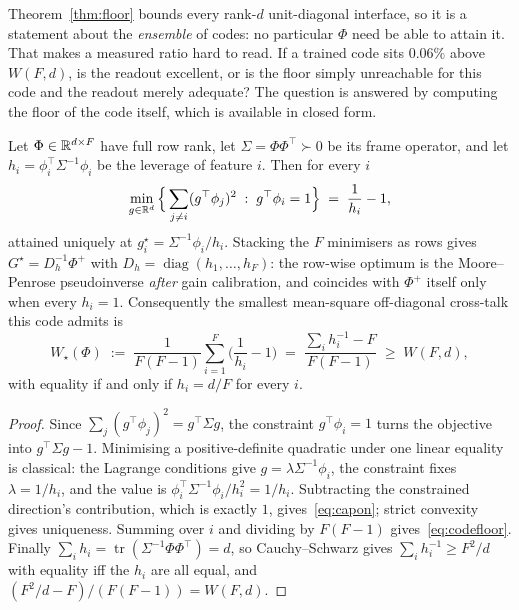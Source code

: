 Theorem~\ref{thm:floor} bounds every rank-$d$ unit-diagonal interface, so it is a statement
about the \emph{ensemble} of codes: no particular $\Phi$ need be able to attain it. That makes a
measured ratio hard to read. If a trained code sits $0.06\%$ above $W(F,d)$, is the readout
excellent, or is the floor simply unreachable for this code and the readout merely adequate? The
question is answered by computing the floor of the code itself, which is available in closed
form.

\begin{theorem}
\label{thm:codefloor}
Let $\Phi\in\mathbb{R}^{d\times F}$ have full row rank, let $\Sigma=\Phi\Phi^{\top}\succ0$ be its frame
operator, and let $h_i=\phi_i^{\top}\Sigma^{-1}\phi_i$ be the leverage of feature $i$. Then for
every $i$
\begin{equation}
  \min_{g\in\mathbb{R}^d}\Big\{\sum_{j\neq i}(g^{\top}\phi_j)^2 \;:\; g^{\top}\phi_i=1\Big\}
  \;=\;\frac{1}{h_i}-1,
  \label{eq:capon}
\end{equation}
attained uniquely at $g_i^{\star}=\Sigma^{-1}\phi_i/h_i$. Stacking the $F$ minimisers as rows gives
$G^{\star}=D_h^{-1}\Phi^{+}$ with $D_h=\operatorname{diag}(h_1,\dots,h_F)$: the row-wise optimum is
the Moore--Penrose pseudoinverse \emph{after} gain calibration, and coincides with $\Phi^{+}$ itself
only when every $h_i=1$. Consequently the smallest mean-square off-diagonal cross-talk this code
admits is
\begin{equation}
  W_{\star}(\Phi)\;:=\;\frac{1}{F(F-1)}\sum_{i=1}^{F}\Big(\frac1{h_i}-1\Big)
  \;=\;\frac{\sum_i h_i^{-1}-F}{F(F-1)}\;\ge\;W(F,d),
  \label{eq:codefloor}
\end{equation}
with equality if and only if $h_i=d/F$ for every $i$.
\end{theorem}

\begin{proof}
Since $\sum_{j}(g^{\top}\phi_j)^2=g^{\top}\Sigma g$, the constraint $g^{\top}\phi_i=1$ turns the
objective into $g^{\top}\Sigma g-1$. Minimising a positive-definite quadratic under one linear
equality is classical: the Lagrange conditions give $g=\lambda\Sigma^{-1}\phi_i$, the constraint
fixes $\lambda=1/h_i$, and the value is $\phi_i^{\top}\Sigma^{-1}\phi_i/h_i^2=1/h_i$. Subtracting
the constrained direction's contribution, which is exactly $1$, gives~\eqref{eq:capon}; strict
convexity gives uniqueness. Summing over $i$ and dividing by $F(F-1)$
gives~\eqref{eq:codefloor}. Finally $\sum_ih_i=\operatorname{tr}(\Sigma^{-1}\Phi\Phi^{\top})=d$,
so Cauchy--Schwarz gives $\sum_ih_i^{-1}\ge F^2/d$ with equality iff the $h_i$ are all equal,
and $(F^2/d-F)/(F(F-1))=W(F,d)$.
\end{proof}

